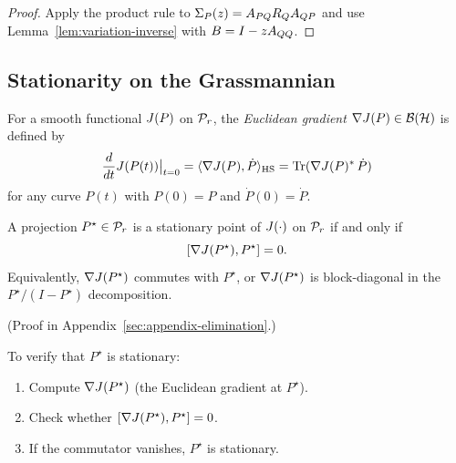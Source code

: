 \begin{proof}
Apply the product rule to $\Sigma_{P}(z) = A_{PQ} R_Q A_{QP}$ and use Lemma~\ref{lem:variation-inverse} with $B = I - zA_{QQ}$.
\end{proof}

\subsection{Stationarity on the Grassmannian}
\label{subsec:stationarity}

\begin{definition}
\label{def:euclidean-gradient}
For a smooth functional $J(P)$ on $\mathcal{P}_{r}$, the \emph{Euclidean gradient} $\nabla J(P) \in \mathcal{B}(\mathcal{H})$ is defined by
\[
\frac{d}{dt} J(P(t)) \big|_{t=0} = \langle \nabla J(P), \dot{P} \rangle_{\mathrm{HS}} = \mathrm{Tr}(\nabla J(P)^* \, \dot{P})
\]
for any curve $P(t)$ with $P(0) = P$ and $\dot{P}(0) = \dot{P}$.
\end{definition}

\begin{theorem}
\label{thm:stationarity-condition}
A projection $P^\star \in \mathcal{P}_{r}$ is a stationary point of $J(\cdot)$ on $\mathcal{P}_{r}$ if and only if
\[
[\nabla J(P^\star), P^\star] = 0.
\]
Equivalently, $\nabla J(P^\star)$ commutes with $P^\star$, or $\nabla J(P^\star)$ is block-diagonal in the $P^\star / (I - P^\star)$ decomposition.
\end{theorem}

(Proof in Appendix~\ref{sec:appendix-elimination}.)

\begin{corollary}
\label{cor:check-stationarity}
To verify that $P^\star$ is stationary:
\begin{enumerate}[label=(\roman*)]
\item Compute $\nabla J(P^\star)$ (the Euclidean gradient at $P^\star$).
\item Check whether $[\nabla J(P^\star), P^\star] = 0$.
\item If the commutator vanishes, $P^\star$ is stationary.
\end{enumerate}
\end{corollary}

